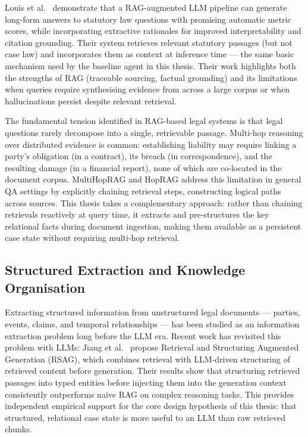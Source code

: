 Louis et al.\ \cite{louis2023interpretablelongformlegalquestion} demonstrate that a RAG-augmented LLM pipeline can generate long-form answers to statutory 
law questions with promising automatic metric scores, while incorporating extractive rationales for improved interpretability and citation grounding. 
Their system retrieves relevant statutory passages (but not case law) and incorporates them as context at inference time 
--- the same basic mechanism used by the baseline agent in this thesis. 
Their work highlights both the strengths of RAG (traceable sourcing, factual grounding) and its limitations when queries require 
synthesising evidence from across a large corpus or when hallucinations persist despite relevant retrieval.

The fundamental tension identified in RAG-based legal systems is that legal questions rarely decompose into a single, retrievable passage. Multi-hop reasoning over distributed evidence is common: establishing liability may require linking a party's obligation (in a contract), its breach (in correspondence), and the resulting damage (in a financial report), none of which are co-located in the document corpus. MultiHopRAG \cite{tang2024multihoprag} and HopRAG \cite{liu2025hoprag} address this limitation in general QA settings by explicitly chaining retrieval steps, constructing logical paths across sources. This thesis takes a complementary approach: rather than chaining retrievals reactively at query time, it extracts and pre-structures the key relational facts during document ingestion, making them available as a persistent case state without requiring multi-hop retrieval.

\subsection{Structured Extraction and Knowledge Organisation}

Extracting structured information from unstructured legal documents --- parties, events, claims, and temporal relationships --- has been studied as an information extraction problem long before the LLM era. Recent work has revisited this problem with LLMs: Jiang et al.\ \cite{Jiang_2025} propose Retrieval and Structuring Augmented Generation (RSAG), which combines retrieval with LLM-driven structuring of retrieved content before generation. Their results show that structuring retrieved passages into typed entities before injecting them into the generation context consistently outperforms naive RAG on complex reasoning tasks. This provides independent empirical support for the core design hypothesis of this thesis: that structured, relational case state is more useful to an LLM than raw retrieved chunks.

